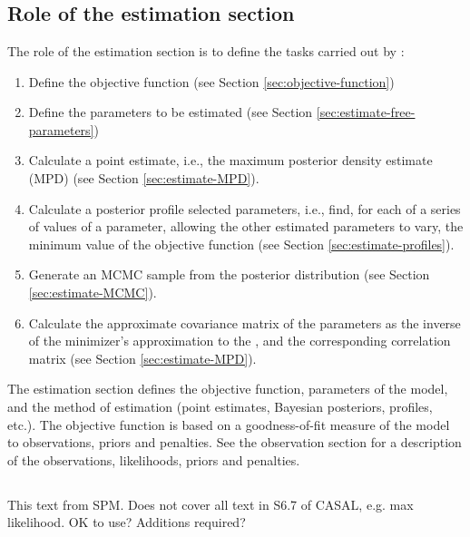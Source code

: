 \section{\label{sec:estimation-section}}

\subsection{Role of the estimation section\label{sec:role-of-the-estimation-section}}
The role of the estimation section is to define the tasks carried out by \CNAME: 

\begin{enumerate}
  \item Define the objective function (see Section \ref{sec:objective-function})
  \item Define the parameters to be estimated (see Section \ref{sec:estimate-free-parameters})
  \item Calculate a point estimate, i.e., the maximum posterior density estimate (MPD) (see Section \ref{sec:estimate-MPD}).
  \item Calculate a posterior profile selected parameters, i.e., find, for each of a series of values of a parameter, allowing the other estimated parameters to vary, the minimum value of the objective function (see Section \ref{sec:estimate-profiles}).
  \item Generate an MCMC sample from the posterior distribution (see Section \ref{sec:estimate-MCMC}).
  \item Calculate the approximate covariance matrix of the parameters as the inverse of the minimizer\textquoteright{}s approximation to the , and the corresponding correlation matrix (see Section \ref{sec:estimate-MPD}).
\end{enumerate}

The estimation section defines the objective function, parameters of the model, and the method of estimation (point estimates, Bayesian posteriors, profiles, etc.). The objective function is based on a goodness-of-fit measure of the model to observations, priors and penalties. See the observation section for a description of the observations, likelihoods, priors and penalties. 

\subsection{\label{sec:objective-function}}
\CH
\KL This text from SPM. Does not cover all text in S6.7 of CASAL, e.g. max likelihood. OK to use? Additions required? \KLend

